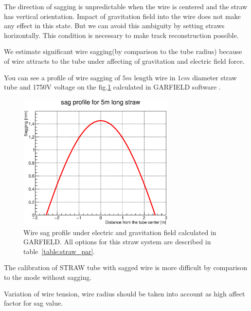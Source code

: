 \documentclass[]{article}
\begin{document}
	The direction of sagging is unpredictable when the wire is centered and the straw has vertical orientation. Impact of gravitation field into the wire does not make any effect in this state. But we can avoid this ambiguity by setting straws horizontally. This condition is necessary to make track reconstruction possible.
	
	We estimate significant wire sagging(by comparison to the tube radius) because of wire attracts to the tube under affecting of gravitation and electric field force.
	
	
	
	You can see a profile of wire sagging of $5m$ length wire in $1cm$ diameter straw tube and 1750V voltage on the fig.\ref{fig:sagProfile} calculated in GARFIELD software \cite{garfield}.
	
	\begin{figure}[h!]
	\centering
	\includegraphics[width=0.7\textwidth]{sagProfileFit.eps}
	\caption{Wire sag profile under electric and gravitation field calculated in GARFIELD. All options for this straw system are described in table~\ref{table:straw_par}.}
	\label{fig:sagProfile}
	\end{figure}	
		
	The calibration of STRAW tube with sagged wire is more difficult by comparison to the mode without sagging. 
	
	Variation of wire tension, wire radius should be taken into account as high affect factor for sag value.
	
\end{document}
